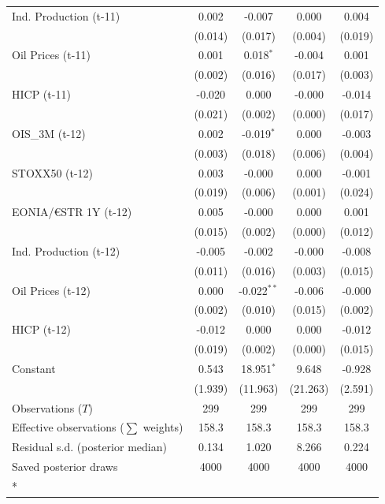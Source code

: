 \begin{longtable}[t]{lcccc}
Ind. Production (t-11) & 0.002 & -0.007 & 0.000 & 0.004\\
 & (0.014) & (0.017) & (0.004) & (0.019)\\
Oil Prices (t-11) & 0.001 & 0.018$^{*}$ & -0.004 & 0.001\\
 & (0.002) & (0.016) & (0.017) & (0.003)\\
HICP (t-11) & -0.020 & 0.000 & -0.000 & -0.014\\
 & (0.021) & (0.002) & (0.000) & (0.017)\\
OIS\_3M (t-12) & 0.002 & -0.019$^{*}$ & 0.000 & -0.003\\
 & (0.003) & (0.018) & (0.006) & (0.004)\\
STOXX50 (t-12) & 0.003 & -0.000 & 0.000 & -0.001\\
 & (0.019) & (0.006) & (0.001) & (0.024)\\
EONIA/€STR 1Y (t-12) & 0.005 & -0.000 & 0.000 & 0.001\\
 & (0.015) & (0.002) & (0.000) & (0.012)\\
Ind. Production (t-12) & -0.005 & -0.002 & -0.000 & -0.008\\
 & (0.011) & (0.016) & (0.003) & (0.015)\\
Oil Prices (t-12) & 0.000 & -0.022$^{**}$ & -0.006 & -0.000\\
 & (0.002) & (0.010) & (0.015) & (0.002)\\
HICP (t-12) & -0.012 & 0.000 & 0.000 & -0.012\\
 & (0.019) & (0.002) & (0.000) & (0.015)\\
Constant & 0.543 & 18.951$^{*}$ & 9.648 & -0.928\\
 & (1.939) & (11.963) & (21.263) & (2.591)\\
\midrule
Observations ($T$) & 299 & 299 & 299 & 299\\
Effective observations ($\sum$ weights) & 158.3 & 158.3 & 158.3 & 158.3\\
Residual s.d. (posterior median) & 0.134 & 1.020 & 8.266 & 0.224\\
Saved posterior draws & 4000 & 4000 & 4000 & 4000\\*
\end{longtable}
\endgroup{}

